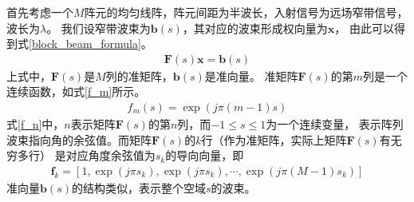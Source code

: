\documentclass[master]{thesis-uestc}
\begin{document}
首先考虑一个$M$阵元的均匀线阵，阵元间距为半波长，入射信号为远场窄带信号，波长为$\lambda$。
我们设窄带波束为$\bm{b}(s)$，其对应的波束形成权向量为$\bm{x}$，
由此可以得到式\eqref{block_beam_formula}。
\begin{equation}\label{block_beam_formula}
    \begin{aligned}
        \bm{F}(s)\bm{x} = \bm{b}(s)
    \end{aligned}
\end{equation}
上式中，$\bm{F}(s)$是$M$列的准矩阵，$\bm{b}(s)$是准向量。
准矩阵$\bm{F}(s)$的第$m$列是一个连续函数，如式\eqref{f_m}所示。
\begin{equation}\label{f_m}
    \begin{aligned}
        f_m(s) = \exp\left(j\pi(m-1)s\right)
    \end{aligned}
\end{equation}
式\eqref{f_n}中，$n$表示矩阵$\bm{F}(s)$的第$n$列，而$-1\le s \le 1$为一个连续变量，
表示阵列波束指向角的余弦值。而矩阵$\bm{F}(s)$的$k$行（作为准矩阵，实际上矩阵$\bm{F}(s)$有无穷多行）
是对应角度余弦值为$s_k$的导向向量，即
\begin{equation}\label{f_k}
    \begin{aligned}
        \bm{f}_k = \left[1, \exp\left(j\pi s_k\right), \exp\left(j\pi s_k\right), \cdots,
                   \exp\left(j\pi(M-1)s_k\right)
                   \right]
    \end{aligned}
\end{equation}
准向量$\bm{b}(s)$的结构类似，表示整个空域$s$的波束。
\end{document}
